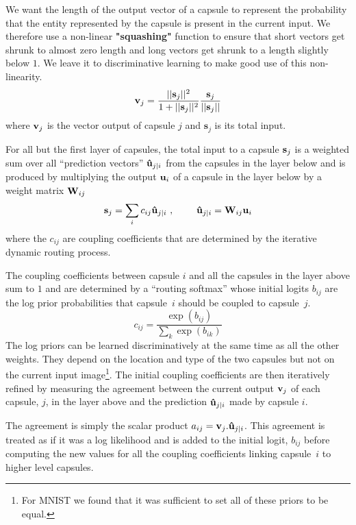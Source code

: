 \documentclass{article}
\begin{document}
We want the length of the output vector of a capsule to represent the probability that the entity represented by the capsule is present in the current input.
We therefore use a non-linear {\bf "squashing"} function to ensure that short vectors get shrunk to almost zero length and long vectors get shrunk to a length slightly below $1$. We leave it to discriminative learning to make good use of this non-linearity. 
\begin{equation}
{\bf v}_j = \frac{||{\bf s}_j||^2}{1+||{\bf s}_j||^2} \frac{{\bf s}_j}{||{\bf s}_j||}
\label{squash}
\end{equation}
where ${\bf v}_j$ is the vector output of capsule $j$ and ${\mathbf{s}}_j$ is its total input.
 
For all but the first layer of capsules, the total input to a capsule ${\bf s}_j$ is a weighted sum over all ``prediction vectors'' ${\bf \hat{u}}_{j|i}$ from the capsules in the layer below and is produced by multiplying the output  ${\bf u}_i$ of a capsule in the layer below by a weight matrix  ${\bf W}_{ij}$
\begin{equation}
{\bf s}_j = \sum_i c_{ij} {\bf \hat{u}}_{j|i} \ , \ \ \ \ \ \ \ 
{\bf \hat{u}}_{j|i} = {\bf W}_{ij}{\bf u}_i 
\end{equation}where the $c_{ij}$ are coupling coefficients that are determined by the iterative dynamic routing process. 

The coupling coefficients between capsule $i$ and all the capsules in the layer above sum to $1$ and are determined by a ``routing softmax'' whose initial logits $b_{ij}$ are the log prior probabilities that capsule~$i$ should be coupled to capsule~$j$. 
\begin{equation}
c_{ij} = \frac{\exp(b_{ij})}{\sum_k \exp(b_{ik})}
\label{softmax}
\end{equation}
The log priors can be learned discriminatively at the same time as all the other weights.  They depend on the location and type of the two capsules but not on the current input image\footnote{For MNIST we found that it was sufficient to set all of these priors to be equal.}. The initial coupling coefficients are then iteratively refined by measuring the agreement between the current output ${\bf v}_j$ of each capsule, $j$, in the layer above and the prediction ${\bf \hat{u}}_{j|i}$ made by capsule $i$. 

The agreement is simply the scalar product $a_{ij} = {\bf v}_j . {\bf \hat{ u}}_{j|i}$.  This agreement is treated as if it was a log likelihood and is added to the initial logit, $b_{ij}$ before computing the new values for all the coupling coefficients linking capsule~$i$ to higher level capsules.
\end{document}

